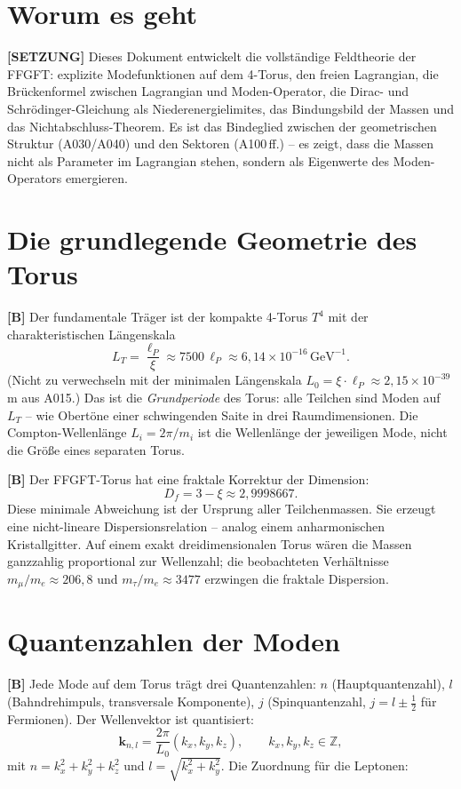 \section{Worum es geht}

\textbf{[SETZUNG]} Dieses Dokument entwickelt die vollständige Feldtheorie der
FFGFT: explizite Modefunktionen auf dem 4-Torus, den freien Lagrangian, die
Brückenformel zwischen Lagrangian und Moden-Operator, die Dirac- und
Schrödinger-Gleichung als Niederenergielimites, das Bindungsbild der Massen und
das Nichtabschluss-Theorem. Es ist das Bindeglied zwischen der geometrischen
Struktur (A030/A040) und den Sektoren (A100\,ff.) -- es zeigt, dass die Massen
nicht als Parameter im Lagrangian stehen, sondern als Eigenwerte des
Moden-Operators emergieren.

\section{Die grundlegende Geometrie des Torus}

\textbf{[B]} Der fundamentale Träger ist der kompakte 4-Torus $T^4$ mit der
charakteristischen Längenskala
\[
  L_T = \frac{\ell_P}{\xi}\approx7500\,\ell_P\approx6{,}14\times10^{-16}\,\text{GeV}^{-1}.
\]
(Nicht zu verwechseln mit der minimalen Längenskala $L_0=\xi\cdot\ell_P\approx2{,}15\times10^{-39}\,$m aus A015.)
Das ist die \emph{Grundperiode} des Torus: alle Teilchen sind Moden auf $L_T$ --
wie Obertöne einer schwingenden Saite in drei Raumdimensionen. Die
Compton-Wellenlänge $L_i=2\pi/m_i$ ist die Wellenlänge der jeweiligen Mode,
nicht die Größe eines separaten Torus.

\textbf{[B]} Der FFGFT-Torus hat eine fraktale Korrektur der Dimension:
\[
  D_f = 3-\xi\approx 2{,}9998667.
\]
Diese minimale Abweichung ist der Ursprung aller Teilchenmassen. Sie erzeugt eine
nicht-lineare Dispersionsrelation -- analog einem anharmonischen Kristallgitter.
Auf einem exakt dreidimensionalen Torus wären die Massen ganzzahlig proportional
zur Wellenzahl; die beobachteten Verhältnisse $m_\mu/m_e\approx206{,}8$ und
$m_\tau/m_e\approx3477$ erzwingen die fraktale Dispersion.

\section{Quantenzahlen der Moden}

\textbf{[B]} Jede Mode auf dem Torus trägt drei Quantenzahlen: $n$ (Hauptquantenzahl),
$l$ (Bahndrehimpuls, transversale Komponente), $j$ (Spinquantenzahl,
$j=l\pm\tfrac12$ für Fermionen). Der Wellenvektor ist quantisiert:
\[
  \mathbf k_{n,l} = \frac{2\pi}{L_0}(k_x,k_y,k_z),\qquad k_x,k_y,k_z\in\mathbb Z,
\]
mit $n=k_x^2+k_y^2+k_z^2$ und $l=\sqrt{k_x^2+k_y^2}$. Die Zuordnung für die
Leptonen:

